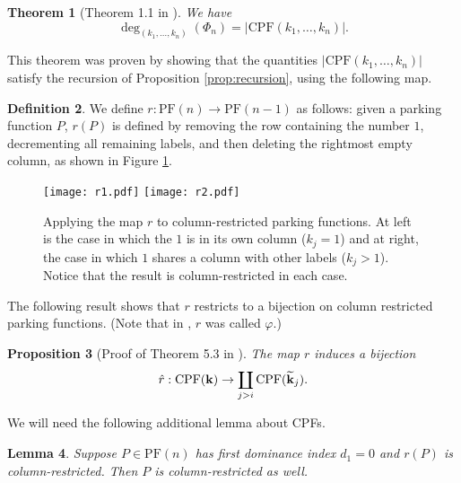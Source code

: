 \documentclass[11pt]{amsart}
\newcommand{\PF}{\mathrm{PF}}
\newcommand{\CPF}{\mathrm{CPF}}
\newcommand{\emb}{\Phi}
\newtheorem{thm}{Theorem}
\newtheorem{lemma}[thm]{Lemma}
\newtheorem{prop}[thm]{Proposition}
\numberwithin{thm}{section}
\numberwithin{equation}{section}
\numberwithin{figure}{section}
\theoremstyle{definition}
\newtheorem{definition}[thm]{Definition}
\begin{document}
\begin{thm}[Theorem 1.1 in \cite{CGM}]\label{thm:CPFs}
 We have $$\deg_{(k_1,\ldots,k_n)}(\emb_n)=|\CPF(k_1,\ldots,k_n)|.$$ 
\end{thm}

This theorem was proven by showing that the quantities $|\CPF(k_1,\ldots,k_n)|$ satisfy the recursion of Proposition \ref{prop:recursion}, using the following map.

\begin{definition}
We define $r : \PF(n) \to \PF(n-1)$ as follows: given a parking function $P$, $r(P)$ is defined by removing the row containing the number $1$, decrementing all remaining labels, and then deleting the rightmost empty column, as shown in Figure \ref{fig:r}. 
\end{definition}

\begin{figure}
    \centering
    \texttt{[image: r1.pdf]} \hspace{2cm} \texttt{[image: r2.pdf]}
    \caption{Applying the map $r$ to column-restricted parking functions.  At left is the case in which the $1$ is in its own column ($k_j=1$) and at right, the case in which $1$ shares a column with other labels ($k_j>1$).  Notice that the result is column-restricted in each case.}
    \label{fig:r}
\end{figure}

The following result shows that $r$ restricts to a bijection on column restricted parking functions.  (Note that in \cite{CGM}, $r$ was called $\varphi$.)

\begin{prop}[Proof of Theorem 5.3 in \cite{CGM}]
The map $r$ induces a bijection
\begin{equation}\label{eq:r-map}
\hat{r}:\CPF(\mathbf{k})\to \coprod_{j>i}\CPF(\widetilde{\bf k}_j).
\end{equation}  
\end{prop}

We will need the following additional lemma about CPFs.

\begin{lemma}\label{lem:reverse-cpf}
  Suppose $P \in \PF(n)$ has first dominance index $d_1=0$ and $r(P)$ is column-restricted.  Then $P$ is column-restricted as well.
\end{lemma}
\end{document}
